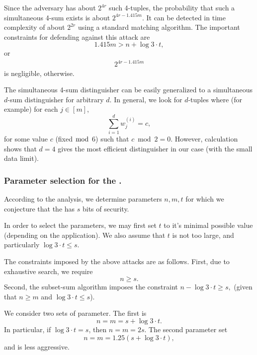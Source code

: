 Since the adversary has about $2^{4r}$ such 4-tuples, the probability that such a simultaneous 4-sum exists is about $2^{4r - 1.415 m}$. It can be detected in time complexity of about $2^{2r}$ using a standard matching algorithm. The important constraints for defending against this attack are
$$1.415 m > n + \log 3 \cdot t,$$ or
\begin{align}
\label{eq:sim}
2^{4r - 1.415 m}
\end{align}
is negligible, otherwise.

The simultaneous 4-sum distinguisher can be easily generalized to a
simultaneous $d$-sum distinguisher for arbitrary $d$.
In general, we look for $d$-tuples where (for example)
for each $j \in [m]$, $$\sum_{i = 1}^{d} w^{(i)}_j = c,$$
for some value $c$ (fixed $\bmod$ 6) such that $c \bmod 2 = 0$.
However, calculation shows that $d = 4$ gives the most efficient
distinguisher in our case (with the small data limit).





\subsubsection{Parameter selection for the \ttwPRF.}
According to the analysis, we determine parameters $n,m,t$ for which
we conjecture that the \ttwPRF has $s$ bits of security.

In order to select the parameters, we may first set $t$ to it's minimal possible value
(depending on the application).
We also assume that $t$ is not too large, and particularly $\log 3 \cdot t \leq s$.

The constraints imposed by the above attacks are as follows.
First, due to exhaustive search, we require $$n \geq s.$$
Second, the subset-sum algorithm
imposes the constraint
$n - \log 3 \cdot t \geq s,$
(given that $n \geq m$ and $\log 3 \cdot t \leq s$).


We consider two sets of parameter.
The first is
$$n = m = s + \log 3 \cdot t.$$
In particular, if $\log 3 \cdot t  = s$, then
$n = m = 2s$.
The second parameter set
$$n = m = 1.25(s + \log 3 \cdot t),$$
and is less aggressive.

